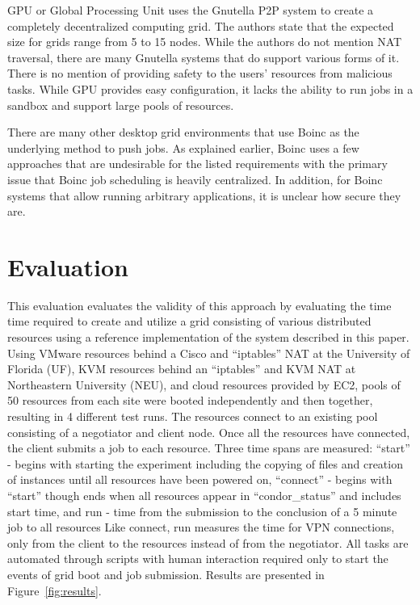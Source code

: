 GPU or Global Processing Unit uses the Gnutella P2P system to create a
completely decentralized computing grid.  The authors state that the expected
size for grids range from 5 to 15 nodes.  While the authors do not mention NAT
traversal, there are many Gnutella systems that do support various forms of it.
There is no mention of providing safety to the users' resources from malicious
tasks.  While GPU provides easy configuration, it lacks the ability to run
jobs in a sandbox and support large pools of resources.

There are many other desktop grid environments that use Boinc as the underlying
method to push jobs.  As explained earlier, Boinc uses a few approaches that
are undesirable for the listed requirements with the primary issue that Boinc
job scheduling is heavily centralized.  In addition, for Boinc systems that
allow running arbitrary applications, it is unclear how secure they are.

\section{Evaluation}
\label{evaluation}
This evaluation evaluates the validity of this approach by evaluating the time
time required to create and utilize a grid consisting of various distributed
resources using a reference implementation of the system described in this
paper.  Using VMware resources behind a Cisco and ``iptables'' NAT at the
University of Florida (UF), KVM resources behind an ``iptables'' and KVM NAT at
Northeastern University (NEU), and cloud resources provided by EC2, pools of 50
resources from each site were booted independently and then together, resulting
in 4 different test runs.  The resources connect to an existing pool consisting
of a negotiator and client node.  Once all the resources have connected, the
client submits a job to each resource.  Three time spans are measured: ``start''
- begins with starting the experiment including the copying of files and
creation of instances until all resources have been powered on, ``connect'' -
begins with ``start'' though ends when all resources appear in
``condor\_status'' and includes start time, and run - time from the submission
to the conclusion of a 5 minute job to all resources Like connect, run measures
the time for VPN connections, only from the client to the resources instead of
from the negotiator.  All tasks are automated through scripts with human
interaction required only to start the events of grid boot and job submission.
Results are presented in Figure~\ref{fig:results}.

